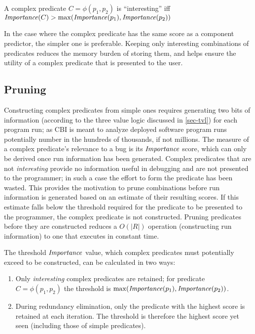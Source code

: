 \begin{defn}
\label{dfn3}
A complex predicate $C = \phi(p_1, p_2)$ is ``interesting'' iff $\mathit{Importance}(C) > \max(\mathit{Importance}(p_1), \mathit{Importance}(p_2))$
\end{defn}

In the case where the complex predicate has the same score as a component predictor, the simpler one is preferable.  Keeping only interesting combinations of predicates reduces the memory burden of storing them, and helps ensure the utility of a complex predicate that is presented to the user.

\subsection{Pruning}
\label{sec-pruning}
Constructing complex predicates from simple ones requires generating two bits of information (according to the three value logic discussed in \autoref{sec-tvl}) for each program run; as CBI is meant to analyze deployed software program runs potentially number in the hundreds of thousands, if not millions.  The measure of a complex predicate's relevance to a bug is its $\mathit{Importance}$ score, which can only be derived once run information has been generated.  Complex predicates that are not \emph{interesting} provide no information useful in debugging and are not presented to the programmer; in such a case the effort to form the predicate has been wasted.  This provides the motivation to prune combinations before run information is generated based on an estimate of their resulting scores.  If this estimate falls below the threshold required for the predicate to be presented to the programmer, the complex predicate is not constructed.  Pruning predicates before they are constructed reduces a $O(|R|)$ operation (constructing run information) to one that executes in constant time.

The threshold $\mathit{Importance}$ value, which complex predicates must potentially exceed to be constructed, can be calculated in two ways:
\begin{enumerate}
\item Only \emph{interesting} complex predicates are retained; for predicate $C = \phi(p_1, p_2)$ the threshold is $\max(\mathit{Importance}(p_1), \mathit{Importance}(p_2))$.
\item During redundancy elimination, only the predicate with the highest score is retained at each iteration.  The threshold is therefore the highest score yet seen (including those of simple predicates).
\end{enumerate}


